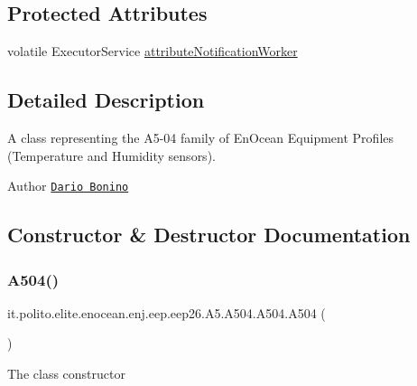 \subsection*{Protected Attributes}
\begin{DoxyCompactItemize}
\item 
volatile Executor\+Service \hyperlink{classit_1_1polito_1_1elite_1_1enocean_1_1enj_1_1eep_1_1eep26_1_1_a5_1_1_a504_1_1_a504_abb3c76008ffdef9ade17d109cae082bc}{attribute\+Notification\+Worker}
\end{DoxyCompactItemize}


\subsection{Detailed Description}
A class representing the A5-\/04 family of En\+Ocean Equipment Profiles (Temperature and Humidity sensors).

\begin{DoxyAuthor}{Author}
\href{mailto:dario.bonino@gmail.com}{\tt Dario Bonino} 
\end{DoxyAuthor}


\subsection{Constructor \& Destructor Documentation}
\hypertarget{classit_1_1polito_1_1elite_1_1enocean_1_1enj_1_1eep_1_1eep26_1_1_a5_1_1_a504_1_1_a504_ac72085d16d63f245d2ddf284f76371c1}{}\label{classit_1_1polito_1_1elite_1_1enocean_1_1enj_1_1eep_1_1eep26_1_1_a5_1_1_a504_1_1_a504_ac72085d16d63f245d2ddf284f76371c1} 
\subsubsection{\texorpdfstring{A504()}{A504()}}
{\footnotesize\ttfamily it.\+polito.\+elite.\+enocean.\+enj.\+eep.\+eep26.\+A5.\+A504.\+A504.\+A504 (\begin{DoxyParamCaption}{ }\end{DoxyParamCaption})}

The class constructor 

